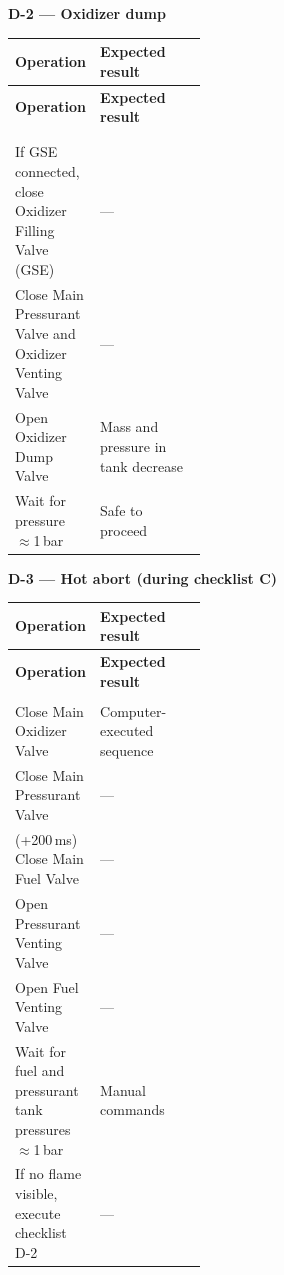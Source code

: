 \medskip
\noindent\textbf{D-2 --- Oxidizer dump}

\medskip
\begin{xltabular}{\linewidth}{@{}>{\raggedright\arraybackslash}p{0.38\linewidth} X@{}}
\toprule
\textbf{Operation} & \textbf{Expected result} \\
\midrule
\endfirsthead
\toprule
\textbf{Operation} & \textbf{Expected result} \\
\midrule
\endhead
\midrule
{} \\
\endfoot
\bottomrule
\endlastfoot
{} \\
If GSE connected, close Oxidizer Filling Valve (GSE) & --- \\
Close Main Pressurant Valve and Oxidizer Venting Valve & --- \\
Open Oxidizer Dump Valve & Mass and pressure in tank decrease \\
Wait for pressure $\approx$1\,bar & Safe to proceed \\
\end{xltabular}

\medskip
\noindent\textbf{D-3 --- Hot abort (during checklist C)}


\medskip
\begin{xltabular}{\linewidth}{@{}>{\raggedright\arraybackslash}p{0.38\linewidth} X@{}}
\toprule
\textbf{Operation} & \textbf{Expected result} \\
\midrule
\endfirsthead
\toprule
\textbf{Operation} & \textbf{Expected result} \\
\midrule
\endhead
\midrule
{} \\
\endfoot
\bottomrule
\endlastfoot
Close Main Oxidizer Valve & Computer-executed sequence \\
Close Main Pressurant Valve & --- \\
(+200\,ms) Close Main Fuel Valve & --- \\
Open Pressurant Venting Valve & --- \\
Open Fuel Venting Valve & --- \\
Wait for fuel and pressurant tank pressures $\approx$1\,bar & Manual commands \\
If no flame visible, execute checklist D-2 & --- \\
\end{xltabular}

